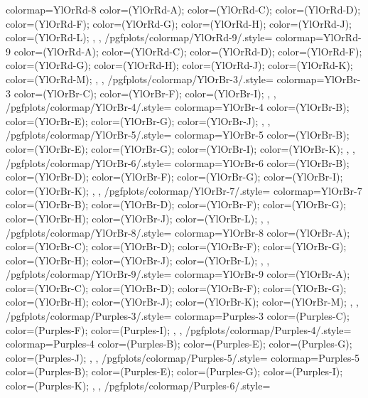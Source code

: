 {{    colormap={YlOrRd-8}{
      color=(YlOrRd-A);
      color=(YlOrRd-C);
      color=(YlOrRd-D);
      color=(YlOrRd-F);
      color=(YlOrRd-G);
      color=(YlOrRd-H);
      color=(YlOrRd-J);
      color=(YlOrRd-L);
    },
  },
  /pgfplots/colormap/YlOrRd-9/.style={
    colormap={YlOrRd-9}{
      color=(YlOrRd-A);
      color=(YlOrRd-C);
      color=(YlOrRd-D);
      color=(YlOrRd-F);
      color=(YlOrRd-G);
      color=(YlOrRd-H);
      color=(YlOrRd-J);
      color=(YlOrRd-K);
      color=(YlOrRd-M);
    },
  },
  /pgfplots/colormap/YlOrBr-3/.style={
    colormap={YlOrBr-3}{
      color=(YlOrBr-C);
      color=(YlOrBr-F);
      color=(YlOrBr-I);
    },
  },
  /pgfplots/colormap/YlOrBr-4/.style={
    colormap={YlOrBr-4}{
      color=(YlOrBr-B);
      color=(YlOrBr-E);
      color=(YlOrBr-G);
      color=(YlOrBr-J);
    },
  },
  /pgfplots/colormap/YlOrBr-5/.style={
    colormap={YlOrBr-5}{
      color=(YlOrBr-B);
      color=(YlOrBr-E);
      color=(YlOrBr-G);
      color=(YlOrBr-I);
      color=(YlOrBr-K);
    },
  },
  /pgfplots/colormap/YlOrBr-6/.style={
    colormap={YlOrBr-6}{
      color=(YlOrBr-B);
      color=(YlOrBr-D);
      color=(YlOrBr-F);
      color=(YlOrBr-G);
      color=(YlOrBr-I);
      color=(YlOrBr-K);
    },
  },
  /pgfplots/colormap/YlOrBr-7/.style={
    colormap={YlOrBr-7}{
      color=(YlOrBr-B);
      color=(YlOrBr-D);
      color=(YlOrBr-F);
      color=(YlOrBr-G);
      color=(YlOrBr-H);
      color=(YlOrBr-J);
      color=(YlOrBr-L);
    },
  },
  /pgfplots/colormap/YlOrBr-8/.style={
    colormap={YlOrBr-8}{
      color=(YlOrBr-A);
      color=(YlOrBr-C);
      color=(YlOrBr-D);
      color=(YlOrBr-F);
      color=(YlOrBr-G);
      color=(YlOrBr-H);
      color=(YlOrBr-J);
      color=(YlOrBr-L);
    },
  },
  /pgfplots/colormap/YlOrBr-9/.style={
    colormap={YlOrBr-9}{
      color=(YlOrBr-A);
      color=(YlOrBr-C);
      color=(YlOrBr-D);
      color=(YlOrBr-F);
      color=(YlOrBr-G);
      color=(YlOrBr-H);
      color=(YlOrBr-J);
      color=(YlOrBr-K);
      color=(YlOrBr-M);
    },
  },
  /pgfplots/colormap/Purples-3/.style={
    colormap={Purples-3}{
      color=(Purples-C);
      color=(Purples-F);
      color=(Purples-I);
    },
  },
  /pgfplots/colormap/Purples-4/.style={
    colormap={Purples-4}{
      color=(Purples-B);
      color=(Purples-E);
      color=(Purples-G);
      color=(Purples-J);
    },
  },
  /pgfplots/colormap/Purples-5/.style={
    colormap={Purples-5}{
      color=(Purples-B);
      color=(Purples-E);
      color=(Purples-G);
      color=(Purples-I);
      color=(Purples-K);
    },
  },
  /pgfplots/colormap/Purples-6/.style={
}}
